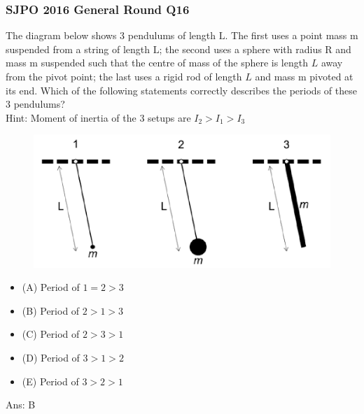 \documentclass{article}
\begin{document}
\subsubsection{SJPO 2016 General Round Q16}
The diagram below shows 3 pendulums of length $\mathrm{L}$. The first uses a point mass $\mathrm{m}$ suspended from a string of length $\mathrm{L}$; the second uses a sphere with radius $\mathrm{R}$ and mass $\mathrm{m}$ suspended such that the centre of mass of the sphere is length $L$ away from the pivot point; the last uses a rigid rod of length $L$ and mass $\mathrm{m}$ pivoted at its end. Which of the following statements correctly describes the periods of these 3 pendulums?\\
\noindent Hint: Moment of inertia of the 3 setups are $I_2>I_1>I_3$ \\
{
\begin{figure} 
\includegraphics[width=\linewidth]{images/sjpo2016q16.png}
\end{figure}
\begin{itemize}
\item[] (A) Period of $1=2>3$
\item[] (B) Period of $2>1>3$
\item[] (C) Period of $2>3>1$
\item[] (D) Period of $3>1>2$
\item[] (E) Period of $3>2>1$
\end{itemize}
}
Ans: \ifpaper B \fi
\end{document}
